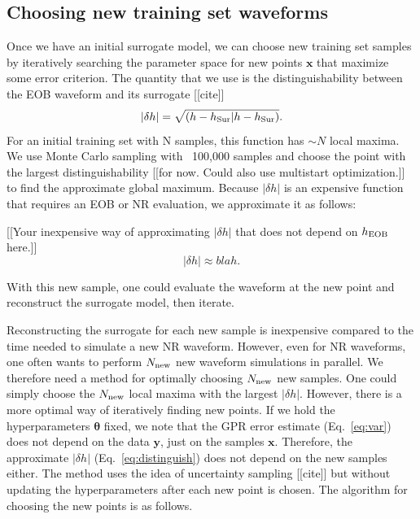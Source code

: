 \documentclass[prd,aps,letter,twocolumn,floatfix,notitlepage,nofootinbib]{revtex4-1}
\begin{document}
\subsection{Choosing new training set waveforms}

Once we have an initial surrogate model, we can choose new training set samples by iteratively searching the parameter space
for new points ${\bm x}$ that maximize some error criterion. The quantity that we use is the distinguishability between the
EOB waveform and its surrogate [[cite]]
\begin{equation}
|\delta h | = \sqrt{(h - h_{\rm Sur} | h - h_{\rm Sur})}.
\end{equation}
For an initial training set with N samples, this function has $\sim N$ local maxima. We use Monte Carlo sampling with ~100,000
samples and choose the point with the largest distinguishability [[for now. Could also use multistart optimization.]] to find the 
approximate global maximum. Because $|\delta h |$ is an expensive function that requires an EOB or NR evaluation, 
we approximate it as follows:

[[Your inexpensive way of approximating $|\delta h |$ that does not depend on $h_{\rm EOB}$ here.]]
\begin{equation}
\label{eq:distinguish}
|\delta h | \approx blah.
\end{equation}


With this new sample, one could evaluate the waveform at the new point and reconstruct the surrogate model, then iterate.

Reconstructing the surrogate for each new sample is inexpensive compared to the time needed to simulate a new NR waveform. 
However, even for NR waveforms, one often wants to perform $N_{\rm new}$ new waveform simulations in parallel. 
We therefore need a method for optimally choosing $N_{\rm new}$ new samples. One could simply choose the 
$N_{\rm new}$ local maxima with the largest $|\delta h |$. However, there is a more optimal way of iteratively finding new points.
If we hold the hyperparameters ${\bm \theta}$ fixed, we note that the GPR error estimate (Eq.~\eqref{eq:var}) does not depend
on the data ${\bm y}$, just on the samples ${\bm x}$. Therefore, the approximate $|\delta h |$ (Eq.~\eqref{eq:distinguish}) does not depend
on the new samples either. The method uses the idea of uncertainty sampling [[cite]] but without updating the hyperparameters
after each new point is chosen. The algorithm for choosing the new points is as follows.
\end{document}
